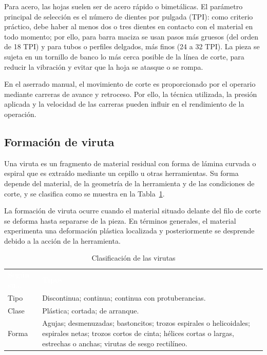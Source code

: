 \documentclass[12pt,a4paper]{article}
\newcommand{\encab}[1]{\textcolor{white}{\sffamily\bfseries #1}}
\begin{document}
\vspace{6pt}

Para acero, las hojas suelen ser de acero rápido o bimetálicas. El parámetro
principal de selección es el número de dientes por pulgada (TPI): como criterio
práctico, debe haber al menos dos o tres dientes en contacto con el material
en todo momento; por ello, para barra maciza se usan pasos más gruesos (del
orden de 18 TPI) y para tubos o perfiles delgados, más finos (24 a 32 TPI). La
pieza se sujeta en un tornillo de banco lo más cerca posible de la línea de
corte, para reducir la vibración y evitar que la hoja se atasque o se rompa.

\vspace{6pt}

En el aserrado manual, el movimiento de corte es proporcionado por el operario
mediante carreras de avance y retroceso. Por ello, la técnica utilizada, la
presión aplicada y la velocidad de las carreras pueden influir en el rendimiento
de la operación.

\subsection{Formación de viruta}

Una viruta es un fragmento de material residual con forma de lámina curvada o
espiral que es extraído mediante un cepillo u otras herramientas. Su forma
depende del material, de la geometría de la herramienta y de las condiciones de
corte, y se clasifica como se muestra en la Tabla~\ref{tab:virutas}.

\vspace{6pt}

La formación de viruta ocurre cuando el material situado delante del filo de
corte se deforma hasta separarse de la pieza. En términos generales, el material
experimenta una deformación plástica localizada y posteriormente se desprende
debido a la acción de la herramienta.

\vspace{6pt}

\begin{table}[!htb]
	\centering
	\caption{Clasificación de las virutas}\label{tab:virutas}
	\small
	\begin{tabularx}{\linewidth}{>{\raggedright\arraybackslash}p{3.2cm} X}
		\rowcolor{darkblue}
		\encab{Según su\ldots} & \encab{Tipos}
		\\
		Tipo                   & Discontinua; continua; continua con protuberancias.
		\\
		Clase                  & Plástica; cortada; de arranque.
		\\
		Forma                  & Agujas; desmenuzadas; bastoncitos; trozos espirales o
		helicoidales; espirales netas; trozos cortos de cinta; hélices cortas o
		largas,
		estrechas o anchas; virutas de sesgo rectilíneo.
		\\
	\end{tabularx}
\end{table}
\end{document}
